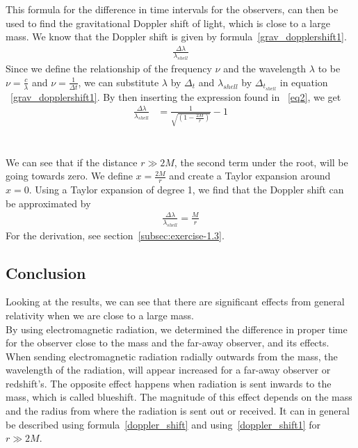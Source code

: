 \documentclass[reprint,english,notitlepage]{revtex4-2}
\begin{document}
        This formula for the difference in time intervals for the observers, can then be used to find the gravitational Doppler shift of light, which is close to a large mass.
        We know that the Doppler shift is given by formula~\eqref{grav_dopplershift1}.
        \begin{align}
            \frac{\Delta \lambda}{\lambda_{shell}} \label{grav_dopplershift1}
        \end{align}
        Since we define the relationship of the frequency $\nu$ and the wavelength $\lambda$ to be $\nu = \frac{c}{\lambda}$ and $\nu = \frac{1}{\Delta t}$, we can substitute $\lambda$ by $\Delta_t$ and $\lambda_{shell}$ by $\Delta_t_{shell}$ in equation ~\eqref{grav_dopplershift1}.
        By then inserting the expression found in ~\eqref{eq2}, we get
        \begin{align}
            \frac{\Delta \lambda}{\lambda_{shell}} &= \frac{1}{\sqrt{\left(1-\frac{2M}{r}\right)}} - 1 \label{doppler_shift}
        \end{align}\\\\

        We can see that if the distance $r \gg 2M$, the second term under the root, will be going towards zero.
        We define $x = \frac{2M}{r}$ and create a Taylor expansion around $x = 0$.
        Using a Taylor expansion of degree 1, we find that the Doppler shift can be approximated by
        \begin{align}
            \frac{\Delta \lambda}{\lambda_{shell}} = \frac{M}{r} \label{doppler_shift1}
        \end{align}
        For the derivation, see section~\ref{subsec:exercise-1.3}.
        


    \subsection{Conclusion}\label{subsec:conclusion1}
        Looking at the results, we can see that there are significant effects from general relativity when we are close to a large mass.\\
        By using electromagnetic radiation, we determined the difference in proper time for the observer close to the mass and the far-away observer, and its effects.\\

        When sending electromagnetic radiation radially outwards from the mass, the wavelength of the radiation, will appear increased for a far-away observer or redshift's.
        The opposite effect happens when radiation is sent inwards to the mass, which is called blueshift.
        The magnitude of this effect depends on the mass and the radius from where the radiation is sent out or received.
        It can in general be described using formula~\eqref{doppler_shift} and using~\eqref{doppler_shift1} for $r \gg 2M$.
\end{document}

